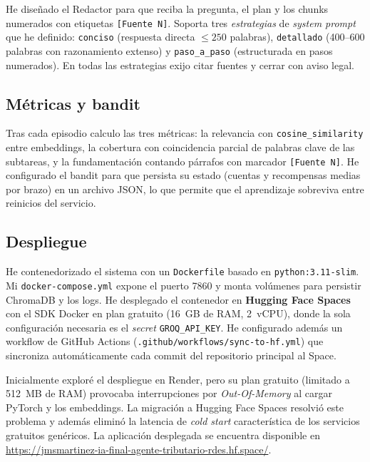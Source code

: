 \documentclass[11pt,a4paper]{article}
\begin{document}
He diseñado el Redactor para que reciba la pregunta, el plan y los chunks numerados con etiquetas \texttt{[Fuente~N]}. Soporta tres \emph{estrategias} de \emph{system prompt} que he definido: \texttt{conciso} (respuesta directa $\le 250$ palabras), \texttt{detallado} (400--600 palabras con razonamiento extenso) y \texttt{paso\_a\_paso} (estructurada en pasos numerados). En todas las estrategias exijo citar fuentes y cerrar con aviso legal.

\subsection{Métricas y bandit}

Tras cada episodio calculo las tres métricas: la relevancia con \texttt{cosine\_similarity} entre embeddings, la cobertura con coincidencia parcial de palabras clave de las subtareas, y la fundamentación contando párrafos con marcador \texttt{[Fuente~N]}. He configurado el bandit para que persista su estado (cuentas y recompensas medias por brazo) en un archivo JSON, lo que permite que el aprendizaje sobreviva entre reinicios del servicio.

\subsection{Despliegue}

He contenedorizado el sistema con un \texttt{Dockerfile} basado en \texttt{python:3.11-slim}. Mi \texttt{docker-compose.yml} expone el puerto 7860 y monta volúmenes para persistir ChromaDB y los logs. He desplegado el contenedor en \textbf{Hugging Face Spaces} con el SDK Docker en plan gratuito (16~GB de RAM, 2~vCPU), donde la sola configuración necesaria es el \emph{secret} \texttt{GROQ\_API\_KEY}. He configurado además un workflow de GitHub Actions (\texttt{.github/workflows/sync-to-hf.yml}) que sincroniza automáticamente cada commit del repositorio principal al Space.

Inicialmente exploré el despliegue en Render, pero su plan gratuito (limitado a 512~MB de RAM) provocaba interrupciones por \emph{Out-Of-Memory} al cargar PyTorch y los embeddings. La migración a Hugging Face Spaces resolvió este problema y además eliminó la latencia de \emph{cold start} característica de los servicios gratuitos genéricos. La aplicación desplegada se encuentra disponible en \url{https://jmsmartinez-ia-final-agente-tributario-rdes.hf.space/}.

\end{document}
